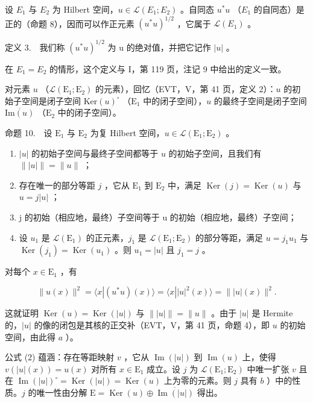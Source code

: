 设 \(E_{1}\) 与 \(E_{2}\) 为 Hilbert 空间，\(u \in \mathcal{L}(E_{1}; E_{2})\) 。自同态 \(u^{*}u\) （\(E_{1}\) 的自同态）是正的（命题 8），因而可以作正元素 \((u^{*}u)^{1/2}\) ，它属于 \(\mathcal{L}(E_{1})\) 。

定义 3.　我们称 \((u^{*}u)^{1/2}\) 为 u 的绝对值，并把它记作 \(|u|\) 。

在 \(E_{1} = E_{2}\) 的情形，这个定义与 I，第 119 页，注记 9 中给出的定义一致。

对元素 \(u\) （\(\mathcal{L}(\mathrm{E}_{1};\mathrm{E}_{2})\) 的元素），回忆（EVT，V，第 41 页，定义 2）：\(u\) 的初始子空间是闭子空间 \(\mathrm{Ker}(u)^{\circ}\) （\(\mathrm{E}_{1}\) 中的闭子空间），\(u\) 的最终子空间是闭子空间 \(\overline{\mathrm{Im}(u)}\) （\(\mathrm{E}_{2}\) 中的闭子空间）。

命题 10.　设 \(\mathrm{E}_1\) 与 \(\mathrm{E}_2\) 为复 Hilbert 空间，\(u \in \mathcal{L}(\mathrm{E}_1; \mathrm{E}_2)\) 。

\begin{enumerate}
\def\labelenumi{\alph{enumi})}
\item
  \(|u|\) 的初始子空间与最终子空间都等于 \(u\) 的初始子空间，且我们有 \(\| |u| \| = \| u\|\) ；
\item
  存在唯一的部分等距 \(j\) ，它从 \(\mathrm{E}_1\) 到 \(\mathrm{E}_2\) 中，满足 \(\operatorname{Ker}(j) = \operatorname{Ker}(u)\) 与 \(u = j|u|\) ；
\item
  j 的初始（相应地，最终）子空间等于 u 的初始（相应地，最终）子空间；
\item
  设 \(u_{1}\) 是 \(\mathcal{L}(\mathrm{E}_{1})\) 的正元素，\(j_{1}\) 是 \(\mathcal{L}(\mathrm{E}_{1};\mathrm{E}_{2})\) 的部分等距，满足 \(u = j_{1}u_{1}\) 与 \(\operatorname{Ker}(j_{1}) = \operatorname{Ker}(u_{1})\) 。则 \(u_{1} = |u|\) 且 \(j_{1} = j\) 。
\end{enumerate}

对每个 \(x\in \mathrm{E}_1\) ，有

\[
\| u (x) \| ^ {2} = \langle x | (u ^ {*} u) (x) \rangle = \langle x | | u | ^ {2} (x) \rangle = \| | u | (x) \| ^ {2}.\tag{2}
\]

这就证明 \(\operatorname{Ker}(u) = \operatorname{Ker}(|u|)\) 与 \(\| |u| \| = \|u\|\) 。由于 \(|u|\) 是 Hermite 的，\(|u|\) 的像的闭包是其核的正交补（EVT，V，第 41 页，命题 4），即 \(u\) 的初始空间，由此得 \(a\) ）。

公式 (2) 蕴涵：存在等距映射 \(v\) ，它从 \(\operatorname{Im}(|u|)\) 到 \(\operatorname{Im}(u)\) 上，使得 \(v(|u|(x)) = u(x)\) 对所有 \(x \in \mathrm{E}_1\) 成立。设 \(j\) 为 \(\mathcal{L}(\mathrm{E}_1; \mathrm{E}_2)\) 中唯一扩张 \(v\) 且在 \(\operatorname{Im}(|u|)^{\circ} = \operatorname{Ker}(|u|) = \operatorname{Ker}(u)\) 上为零的元素。则 \(j\) 具有 \(b\) ）中的性质。\(j\) 的唯一性由分解 \(\mathrm{E} = \operatorname{Ker}(u) \oplus \overline{\operatorname{Im}(|u|)}\) 得出。

